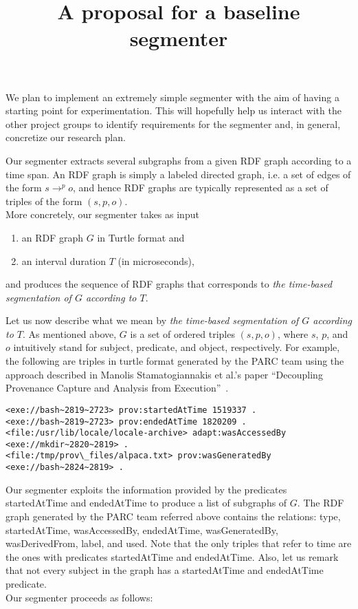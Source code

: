\documentclass{article}
\begin{document}
\title{A proposal for a baseline segmenter}
\maketitle

We plan to implement an extremely simple segmenter with the aim
of having a starting point for experimentation. This will hopefully
help us interact with the other project groups to identify requirements
for the segmenter and, in general, 
concretize our research plan.

Our segmenter extracts several subgraphs from a given 
RDF graph according to a time span.
An RDF graph is simply a labeled directed graph, 
i.e. a set of edges of the form $s \to^p o$,
and hence RDF graphs are typically represented 
as a set of triples of the form $(s,p,o)$.
\\[2ex]
More concretely, our segmenter takes as input
\begin{enumerate}
\item an RDF graph $G$ in Turtle format and
\item an interval duration $T$ (in microseconds),
\end{enumerate}
and produces the sequence of RDF graphs that corresponds to {\em the time-based segmentation of $G$ according to $T$}.

Let us now describe what we mean by {\em the time-based segmentation of $G$ according to $T$}.
As mentioned above, $G$ is a set of ordered triples $(s, p, o)$,
where $s$, $p$, and $o$ intuitively stand for subject, predicate, and object, respectively.
For example, the following are triples in turtle format
generated by the PARC team using the approach described in 
Manolis Stamatogiannakis et al.'s paper ``Decoupling Provenance Capture and
Analysis from Execution''~\cite{stamatogiannakis15tapp}.

{\scriptsize
\begin{verbatim}
<exe://bash~2819~2723> prov:startedAtTime 1519337 .
<exe://bash~2819~2723> prov:endedAtTime 1820209 . 
<file:/usr/lib/locale/locale-archive> adapt:wasAccessedBy <exe://mkdir~2820~2819> . 
<file:/tmp/prov\_files/alpaca.txt> prov:wasGeneratedBy <exe://bash~2824~2819> .
\end{verbatim}
}

Our segmenter exploits the information provided 
by the predicates startedAtTime and endedAtTime
to produce a list of subgraphs of $G$.
The RDF graph generated by the PARC team referred above
contains the relations: 
type, startedAtTime,
wasAccessedBy,
endedAtTime,
wasGeneratedBy,
wasDerivedFrom,
label, and
used.
Note that the only triples that refer to time 
are the ones with predicates
startedAtTime and endedAtTime.
Also, let us remark that not every 
subject in the graph has a 
startedAtTime and endedAtTime
predicate.
\\[2ex]
Our segmenter proceeds as follows:
\end{document}
